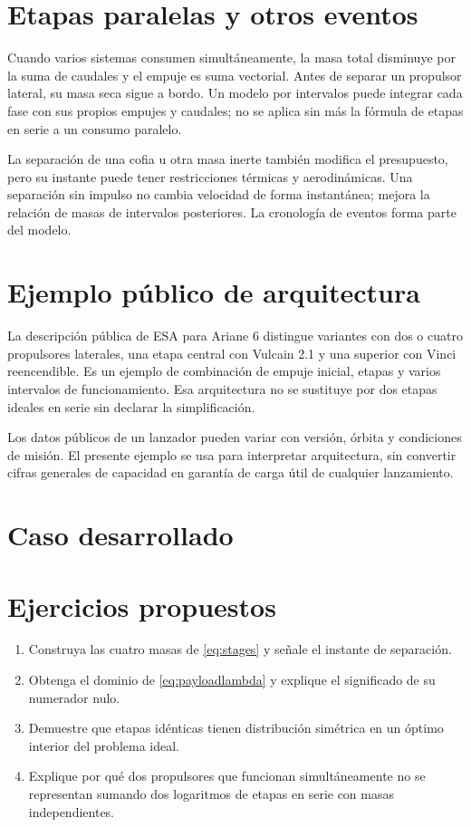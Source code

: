 \section{Etapas paralelas y otros eventos}
Cuando varios sistemas consumen simultáneamente, la masa total disminuye por la suma de caudales y el empuje es suma vectorial. Antes de separar un propulsor lateral, su masa seca sigue a bordo. Un modelo por intervalos puede integrar cada fase con sus propios empujes y caudales; no se aplica sin más la fórmula de etapas en serie a un consumo paralelo.

La separación de una cofia u otra masa inerte también modifica el presupuesto, pero su instante puede tener restricciones térmicas y aerodinámicas. Una separación sin impulso no cambia velocidad de forma instantánea; mejora la relación de masas de intervalos posteriores. La cronología de eventos forma parte del modelo.
\section{Ejemplo público de arquitectura}
La descripción pública de ESA para Ariane 6 distingue variantes con dos o cuatro propulsores laterales, una etapa central con Vulcain 2.1 y una superior con Vinci reencendible. Es un ejemplo de combinación de empuje inicial, etapas y varios intervalos de funcionamiento. Esa arquitectura no se sustituye por dos etapas ideales en serie sin declarar la simplificación.\cite{ARIANE}

Los datos públicos de un lanzador pueden variar con versión, órbita y condiciones de misión. El presente ejemplo se usa para interpretar arquitectura, sin convertir cifras generales de capacidad en garantía de carga útil de cualquier lanzamiento.
\section{Caso desarrollado}

\section{Ejercicios propuestos}
\begin{enumerate}
\item Construya las cuatro masas de \eqref{eq:stages} y señale el instante de separación.
\item Obtenga el dominio de \eqref{eq:payloadlambda} y explique el significado de su numerador nulo.
\item Demuestre que etapas idénticas tienen distribución simétrica en un óptimo interior del problema ideal.
\item Explique por qué dos propulsores que funcionan simultáneamente no se representan sumando dos logaritmos de etapas en serie con masas independientes.
\end{enumerate}


\studiumchaptercheck
